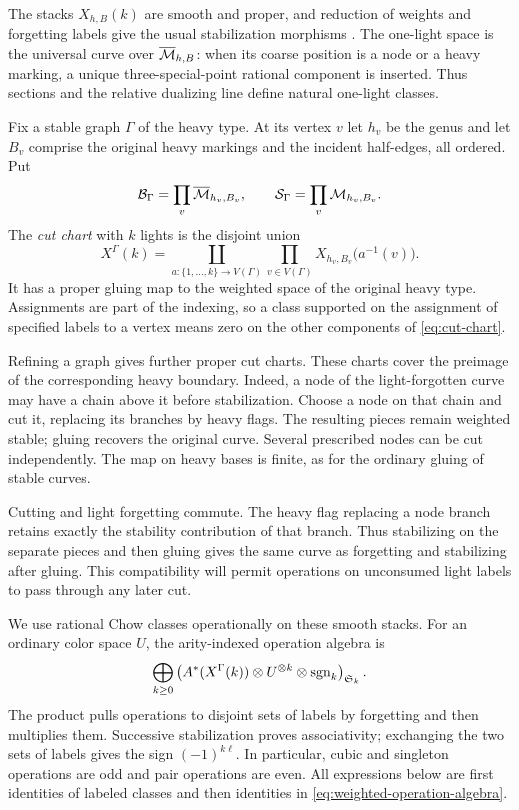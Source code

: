 The stacks $X_{h,B}(k)$ are smooth and proper, and reduction of weights
and forgetting labels give the usual stabilization morphisms
\cite[Theorem~2.1, Proposition~3.8, Theorems~4.1 and~4.3]{Hassett}.
The one-light space is the universal curve over $\overline{\mathcal M}_{h,B}$:
when its coarse position is a node or a heavy marking, a unique
three-special-point rational component is inserted.  Thus sections and
the relative dualizing line define natural one-light classes.

Fix a stable graph $\Gamma$ of the heavy type.  At its vertex $v$ let
$h_v$ be the genus and let $B_v$ comprise the original heavy markings
and the incident half-edges, all ordered.  Put
\[
 \mathcal B_\Gamma=\prod_v\overline{\mathcal M}_{h_v,B_v},
 \qquad
 \mathcal S_\Gamma=\prod_v\mathcal M_{h_v,B_v}.
\]
The \emph{cut chart} with $k$ lights is the disjoint union
\begin{equation}\label{eq:cut-chart}
 X^\Gamma(k)=
 \coprod_{a:\{1,\ldots,k\}\to V(\Gamma)}
 \prod_{v\in V(\Gamma)}X_{h_v,B_v}\bigl(a^{-1}(v)\bigr).
\end{equation}
It has a proper gluing map to the weighted space of the original heavy
type.  Assignments are part of the indexing, so a class supported on
the assignment of specified labels to a vertex means zero on the other
components of \eqref{eq:cut-chart}.

Refining a graph gives further proper cut charts.  These charts cover
the preimage of the corresponding heavy boundary.  Indeed, a node of
the light-forgotten curve may have a chain above it before stabilization.
Choose a node on that chain and cut it, replacing its branches by heavy
flags.  The resulting pieces remain weighted stable; gluing recovers
the original curve.  Several prescribed nodes can be cut independently.
The map on heavy bases is finite, as for the ordinary gluing of stable
curves.

Cutting and light forgetting commute.  The heavy flag replacing a
node branch retains exactly the stability contribution of that branch.
Thus stabilizing on the separate pieces and then gluing gives the same
curve as forgetting and stabilizing after gluing.  This compatibility
will permit operations on unconsumed light labels to pass through any
later cut.

We use rational Chow classes operationally on these smooth stacks.
For an ordinary color space $U$, the arity-indexed operation algebra is
\begin{equation}\label{eq:weighted-operation-algebra}
 \bigoplus_{k\geq0}
 \left(
   A^*(X^\Gamma(k))\otimes U^{\otimes k}
                    \otimes\operatorname{sgn}_k
 \right)_{\mathfrak S_k}.
\end{equation}
The product pulls operations to disjoint sets of labels by forgetting
and then multiplies them.  Successive stabilization proves
associativity; exchanging the two sets of labels gives the sign
$(-1)^{k\ell}$.  In particular, cubic and singleton operations are odd
and pair operations are even.  All expressions below are first
identities of labeled classes and then identities in
\eqref{eq:weighted-operation-algebra}.

